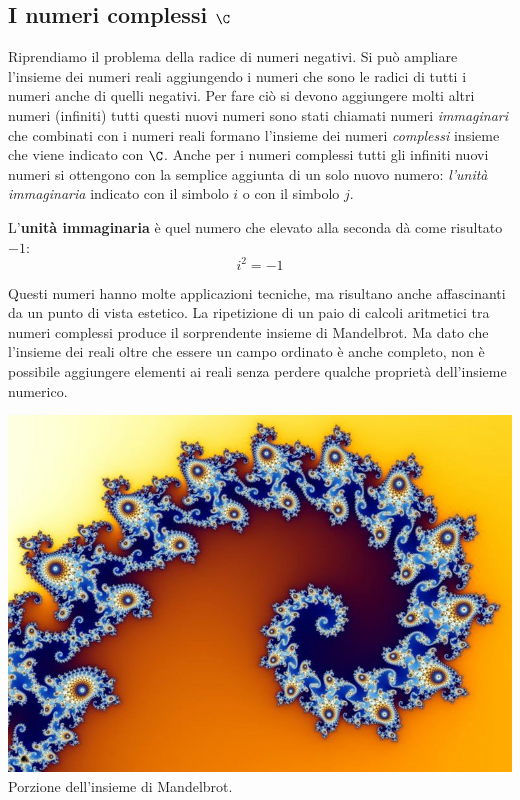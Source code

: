 \subsection{I numeri complessi \(\C\)} \label{subsec:insnum_complessi}

Riprendiamo il problema della radice di numeri negativi. Si può ampliare 
l'insieme dei numeri reali aggiungendo i numeri che sono le radici di tutti i 
numeri anche di quelli negativi. Per fare ciò si devono aggiungere molti altri 
numeri (infiniti) tutti questi nuovi numeri sono stati chiamati numeri 
\emph{immaginari} che combinati con i numeri reali formano l'insieme dei numeri 
\emph{complessi} insieme che viene indicato con \(\C\). Anche per i numeri 
complessi tutti gli infiniti nuovi numeri si ottengono con la semplice aggiunta 
di un solo nuovo numero: \emph{l'unità immaginaria} indicato con il simbolo 
\(i\) o con il simbolo \(j\). \begin{definizione} L'\textbf{unità immaginaria} è 
quel numero che elevato alla seconda dà come risultato \(-1\): \[i^2 = -1\] 
\end{definizione}

{\noindent
\begin{minipage}{.28\textwidth}
Questi numeri hanno molte applicazioni tecniche, ma risultano anche 
affascinanti da un punto di vista estetico. 
La ripetizione di un paio di calcoli aritmetici tra numeri complessi produce il 
sorprendente insieme di Mandelbrot\footnotemark.
Ma dato che l'insieme dei reali oltre che essere un campo ordinato è anche 
completo, non è possibile aggiungere elementi ai reali senza perdere qualche 
proprietà dell'insieme numerico. 
\end{minipage}
\hfill
\begin{minipage}{.70\textwidth}
\begin{inaccessibleblock} 
\begin{center}
\includegraphics[scale=0.35]{img/fractal.jpg} \\
{\footnotesize Porzione dell'insieme di Mandelbrot.} 
\end{center}
\label{fig:mandelbrot} 
\end{inaccessibleblock} 
\end{minipage}
}

